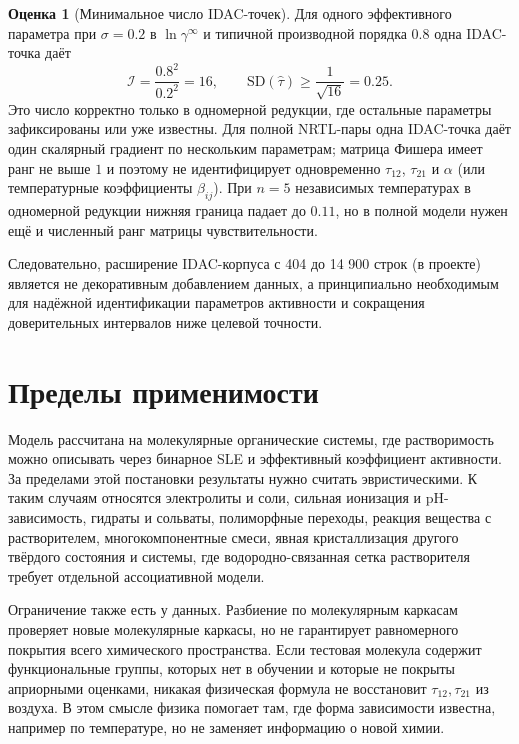 \documentclass[11pt]{article}
\theoremstyle{definition}
\newtheorem{estimate}{Оценка}[section]
\begin{document}
\begin{estimate}[Минимальное число IDAC-точек]
Для одного эффективного параметра при $\sigma = 0.2$ в $\ln\gamma^\infty$ и типичной производной порядка $0.8$ одна IDAC-точка даёт
\begin{equation*}
    \mathcal I = \frac{0.8^2}{0.2^2}=16,
    \qquad
    \mathrm{SD}(\hat\tau)\ge\frac{1}{\sqrt{16}}=0.25.
\end{equation*}
Это число корректно только в одномерной редукции, где остальные параметры зафиксированы или уже известны. Для полной NRTL-пары одна IDAC-точка даёт один скалярный градиент по нескольким параметрам; матрица Фишера имеет ранг не выше $1$ и поэтому не идентифицирует одновременно $\tau_{12}$, $\tau_{21}$ и $\alpha$ (или температурные коэффициенты $\beta_{ij}$). При $n = 5$ независимых температурах в одномерной редукции нижняя граница падает до $0.11$, но в полной модели нужен ещё и численный ранг матрицы чувствительности.

Следовательно, расширение IDAC-корпуса с 404 до 14 900 строк (в проекте) является не декоративным добавлением данных, а принципиально необходимым для надёжной идентификации параметров активности и сокращения доверительных интервалов ниже целевой точности.
\end{estimate}

\section{Пределы применимости}
\label{app:limits}

Модель рассчитана на молекулярные органические системы, где растворимость можно описывать через бинарное SLE и эффективный коэффициент активности. За пределами этой постановки результаты нужно считать эвристическими. К таким случаям относятся электролиты и соли, сильная ионизация и pH-зависимость, гидраты и сольваты, полиморфные переходы, реакция вещества с растворителем, многокомпонентные смеси, явная кристаллизация другого твёрдого состояния и системы, где водородно-связанная сетка растворителя требует отдельной ассоциативной модели.

Ограничение также есть у данных. Разбиение по молекулярным каркасам проверяет новые молекулярные каркасы, но не гарантирует равномерного покрытия всего химического пространства. Если тестовая молекула содержит функциональные группы, которых нет в обучении и которые не покрыты априорными оценками, никакая физическая формула не восстановит $\tau_{12},\tau_{21}$ из воздуха. В этом смысле физика помогает там, где форма зависимости известна, например по температуре, но не заменяет информацию о новой химии.
\end{document}
